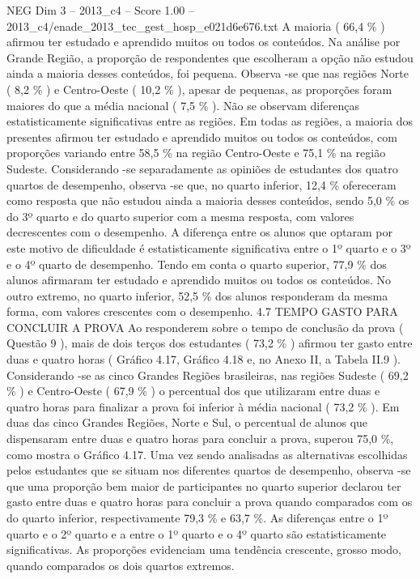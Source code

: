 \begin{textsample}{NEG Dim 3 – 2013\_c4 – Score 1.00 – 2013\_c4/enade\_2013\_tec\_gest\_hosp\_e021d6e676.txt}
A maioria ( 66,4 \% ) afirmou ter estudado e aprendido muitos ou todos os conteúdos.
Na análise por Grande Região, a proporção de respondentes que escolheram a opção não estudou ainda a maioria desses conteúdos, foi pequena.
Observa -se que nas regiões Norte ( 8,2 \% ) e Centro-Oeste ( 10,2 \% ), apesar de pequenas, as proporções foram maiores do que a média nacional ( 7,5 \% ).
Não se observam diferenças estatisticamente significativas entre as regiões.
Em todas as regiões, a maioria dos presentes afirmou ter estudado e aprendido muitos ou todos os conteúdos, com proporções variando entre 58,5 \% na região Centro-Oeste e 75,1 \% na região Sudeste.
Considerando -se separadamente as opiniões de estudantes dos quatro quartos de desempenho, observa -se que, no quarto inferior, 12,4 \% ofereceram como resposta que não estudou ainda a maioria desses conteúdos, sendo 5,0 \% os do 3º quarto e do quarto superior com a mesma resposta, com valores decrescentes com o desempenho.
A diferença entre os alunos que optaram por este motivo de dificuldade é estatisticamente significativa entre o 1º quarto e o 3º e o 4º quarto de desempenho.
Tendo em conta o quarto superior, 77,9 \% dos alunos afirmaram ter estudado e aprendido muitos ou todos os conteúdos.
No outro extremo, no quarto inferior, 52,5 \% dos alunos responderam da mesma forma, com valores crescentes com o desempenho. 4.7 TEMPO GASTO PARA CONCLUIR A PROVA Ao responderem sobre o tempo de conclusão da prova ( Questão 9 ), mais de dois terços dos estudantes ( 73,2 \% ) afirmou ter gasto entre duas e quatro horas ( Gráfico 4.17, Gráfico 4.18 e, no Anexo II, a Tabela II.9 ).
Considerando -se as cinco Grandes Regiões brasileiras, nas regiões Sudeste ( 69,2 \% ) e Centro-Oeste ( 67,9 \% ) o percentual dos que utilizaram entre duas e quatro horas para finalizar a prova foi inferior à média nacional ( 73,2 \% ).
Em duas das cinco Grandes Regiões, Norte e Sul, o percentual de alunos que dispensaram entre duas e quatro horas para concluir a prova, superou 75,0 \%, como mostra o Gráfico 4.17.
Uma vez sendo analisadas as alternativas escolhidas pelos estudantes que se situam nos diferentes quartos de desempenho, observa -se que uma proporção bem maior de participantes no quarto superior declarou ter gasto entre duas e quatro horas para concluir a prova quando comparados com os do quarto inferior, respectivamente 79,3 \% e 63,7 \%.
As diferenças entre o 1º quarto e o 2º quarto e a entre o 1º quarto e o 4º quarto são estatisticamente significativas.
As proporções evidenciam uma tendência crescente, grosso modo, quando comparados os dois quartos extremos.

\end{textsample}

